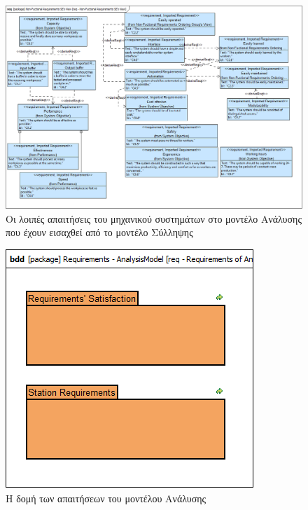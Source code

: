 \documentclass[a4paper,12pt,twoside]{report}
\begin{document}
\begin{appendices}
			\begin{figure}[hp]
					\centering
					\includegraphics[scale=0.30]{AnalysisModel_req-Non-FuctionalRequirementsSEsView.png}
					\caption{Οι λοιπές απαιτήσεις του μηχανικού συστημάτων στο μοντέλο Ανάλυσης που έχουν εισαχθεί από το μοντέλο Σύλληψης}
					\label{φωτ:Οι λοιπές απαιτήσεις του μηχανικού συστημάτων στο μοντέλο Ανάλυσης που έχουν εισαχθεί από το μοντέλο Σύλληψης}
			\end{figure}
				
			\begin{figure}[hp]
					\centering
					\includegraphics[scale=0.30]{AnalysisModel_req-RequirementsofAnalysisModel.png}
					\caption{Η δομή των απαιτήσεων του μοντέλου Ανάλυσης}
					\label{φωτ:Η δομή των απαιτήσεων του μοντέλου Ανάλυσης}
			\end{figure}
			

\end{appendices}
\end{document}
